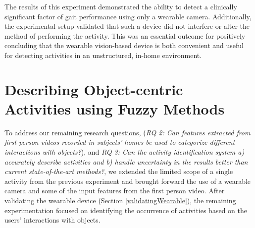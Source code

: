 \documentclass[12pt]{report}
\begin{document}
The results of this experiment demonstrated the ability to detect a clinically significant factor of gait performance using only a wearable camera. Additionally, the experimental setup validated that such a device did not interfere or alter the method of performing the activity. This was an essential outcome for positively concluding that the wearable vision-based device is both convenient and useful for detecting activities in an unstructured, in-home environment.

\section{Describing Object-centric Activities using Fuzzy Methods}
To address our remaining research questions, (\emph{RQ 2: Can features extracted from first person videos recorded in subjects’ homes be used to categorize different interactions with objects?}), and \emph{RQ 3: Can the activity identification system a) accurately describe activities and b) handle uncertainty in the results better than current state-of-the-art methods?}, we extended the limited scope of a single activity from the previous experiment and brought forward the use of a wearable camera and some of the input features from the first person video. After validating the wearable device (Section \ref{validatingWearable}), the remaining experimentation focused on identifying the occurrence of activities based on the users' interactions with objects.
\end{document}
